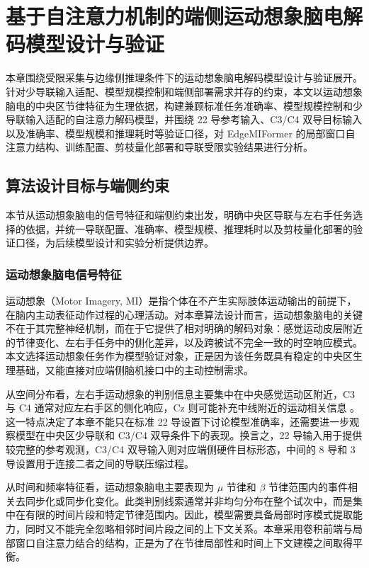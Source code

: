 \chapter{基于自注意力机制的端侧运动想象脑电解码模型设计与验证}
\label{cha:algorithm}

本章围绕受限采集与边缘侧推理条件下的运动想象脑电解码模型设计与验证展开。针对少导联输入适配、模型规模控制和端侧部署需求并存的约束，本文以运动想象脑电的中央区节律特征为生理依据，构建兼顾标准任务准确率、模型规模控制和少导联输入适配的自注意力解码模型，并围绕 22 导参考输入、C3/C4 双导目标输入以及准确率、模型规模和推理耗时等验证口径，对 EdgeMIFormer 的局部窗口自注意力结构、训练配置、剪枝量化部署和导联受限实验结果进行分析。

\section{算法设计目标与端侧约束}
本节从运动想象脑电的信号特征和端侧约束出发，明确中央区导联与左右手任务选择的依据，并统一导联配置、准确率、模型规模、推理耗时以及剪枝量化部署的验证口径，为后续模型设计和实验分析提供边界。

\subsection{运动想象脑电信号特征}
运动想象（Motor Imagery, MI）是指个体在不产生实际肢体运动输出的前提下，在脑内主动表征动作过程的心理活动。对本章算法设计而言，运动想象脑电的关键不在于其完整神经机制，而在于它提供了相对明确的解码对象：感觉运动皮层附近的节律变化、左右手任务中的侧化差异，以及跨被试不完全一致的时空响应模式。本文选择运动想象任务作为模型验证对象，正是因为该任务既具有稳定的中央区生理基础，又能直接对应端侧脑机接口中的主动控制需求。

从空间分布看，左右手运动想象的判别信息主要集中在中央感觉运动区附近，C3 与 C4 通常对应左右手区的侧化响应，Cz 则可能补充中线附近的运动相关信息 \cite{Pfu06,Mcf04}。这一特点决定了本章不能只在标准 22 导设置下讨论模型准确率，还需要进一步观察模型在中央区少导联和 C3/C4 双导条件下的表现。换言之，22 导输入用于提供较完整的参考观测，C3/C4 双导输入则对应端侧硬件目标形态，中间的 8 导和 3 导设置用于连接二者之间的导联压缩过程。

从时间和频率特征看，运动想象脑电主要表现为 $\mu$ 节律和 $\beta$ 节律范围内的事件相关去同步化或同步化变化。此类判别线索通常并非均匀分布在整个试次中，而是集中在有限的时间片段和特定节律范围内。因此，模型需要具备局部时序模式提取能力，同时又不能完全忽略相邻时间片段之间的上下文关系。本章采用卷积前端与局部窗口自注意力结合的结构，正是为了在节律局部性和时间上下文建模之间取得平衡。


